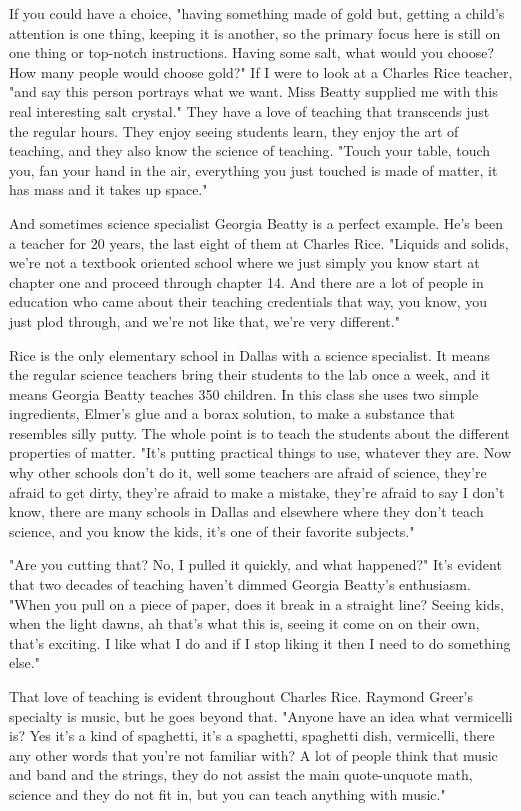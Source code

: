 If you could have a choice, "having something made of gold but, getting a child's attention is one thing, keeping it is another, so the primary focus here is still on one thing or top-notch instructions. Having some salt, what would you choose? How many people would choose gold?" If I were to look at a Charles Rice teacher, "and say this person portrays what we want. Miss Beatty supplied me with this real interesting salt crystal." They have a love of teaching that transcends just the regular hours. They enjoy seeing students learn, they enjoy the art of teaching, and they also know the science of teaching. "Touch your table, touch you, fan your hand in the air, everything you just touched is made of matter, it has mass and it takes up space."

And sometimes science specialist Georgia Beatty is a perfect example. He's been a teacher for 20 years, the last eight of them at Charles Rice. "Liquids and solids, we're not a textbook oriented school where we just simply you know start at chapter one and proceed through chapter 14. And there are a lot of people in education who came about their teaching credentials that way, you know, you just plod through, and we're not like that, we're very different."

Rice is the only elementary school in Dallas with a science specialist. It means the regular science teachers bring their students to the lab once a week, and it means Georgia Beatty teaches 350 children. In this class she uses two simple ingredients, Elmer's glue and a borax solution, to make a substance that resembles silly putty. The whole point is to teach the students about the different properties of matter. "It's putting practical things to use, whatever they are. Now why other schools don't do it, well some teachers are afraid of science, they're afraid to get dirty, they're afraid to make a mistake, they're afraid to say I don't know, there are many schools in Dallas and elsewhere where they don't teach science, and you know the kids, it's one of their favorite subjects."

"Are you cutting that? No, I pulled it quickly, and what happened?" It's evident that two decades of teaching haven't dimmed Georgia Beatty's enthusiasm. "When you pull on a piece of paper, does it break in a straight line? Seeing kids, when the light dawns, ah that's what this is, seeing it come on on their own, that's exciting. I like what I do and if I stop liking it then I need to do something else."

That love of teaching is evident throughout Charles Rice. Raymond Greer's specialty is music, but he goes beyond that. "Anyone have an idea what vermicelli is? Yes it's a kind of spaghetti, it's a spaghetti, spaghetti dish, vermicelli, there any other words that you're not familiar with? A lot of people think that music and band and the strings, they do not assist the main quote-unquote math, science and they do not fit in, but you can teach anything with music."

